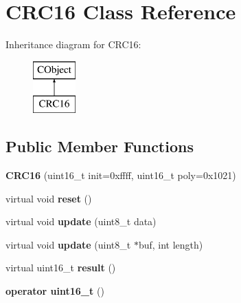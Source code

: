 \hypertarget{class_c_r_c16}{\section{C\-R\-C16 Class Reference}
\label{class_c_r_c16}
}
Inheritance diagram for C\-R\-C16\-:\begin{figure}[H]
\begin{center}
\leavevmode
\includegraphics[height=2.000000cm]{class_c_r_c16}
\end{center}
\end{figure}
\subsection*{Public Member Functions}
\begin{DoxyCompactItemize}
\item 
\hypertarget{class_c_r_c16_a2317eff72b4509289399f5c6b6306db2}{{\bfseries C\-R\-C16} (uint16\-\_\-t init=0xffff, uint16\-\_\-t poly=0x1021)}\label{class_c_r_c16_a2317eff72b4509289399f5c6b6306db2}

\item 
\hypertarget{class_c_r_c16_ad948d7638a1d07540db96cb649ce0d52}{virtual void {\bfseries reset} ()}\label{class_c_r_c16_ad948d7638a1d07540db96cb649ce0d52}

\item 
\hypertarget{class_c_r_c16_afd577ee51489a3e07c4de201b8a3fdf4}{virtual void {\bfseries update} (uint8\-\_\-t data)}\label{class_c_r_c16_afd577ee51489a3e07c4de201b8a3fdf4}

\item 
\hypertarget{class_c_r_c16_aea5d7fae41950ebc9ab79ec0445900f5}{virtual void {\bfseries update} (uint8\-\_\-t $\ast$buf, int length)}\label{class_c_r_c16_aea5d7fae41950ebc9ab79ec0445900f5}

\item 
\hypertarget{class_c_r_c16_aa70e96e936eea96361292dfc3f1a71fc}{virtual uint16\-\_\-t {\bfseries result} ()}\label{class_c_r_c16_aa70e96e936eea96361292dfc3f1a71fc}

\item 
\hypertarget{class_c_r_c16_ac6704db61d9df8cf08e8f5697b7f8b31}{{\bfseries operator uint16\-\_\-t} ()}\label{class_c_r_c16_ac6704db61d9df8cf08e8f5697b7f8b31}

\end{DoxyCompactItemize}
